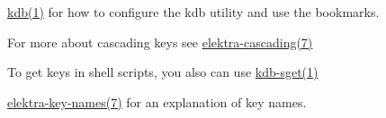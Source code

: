 \begin{DoxyItemize}
\item \hyperlink{doc_help_kdb_md}{kdb(1)} for how to configure the kdb utility and use the bookmarks.
\item For more about cascading keys see \hyperlink{doc_help_elektra-cascading_md}{elektra-\/cascading(7)}
\item To get keys in shell scripts, you also can use \hyperlink{doc_help_kdb-sget_md}{kdb-\/sget(1)}
\item \hyperlink{doc_help_elektra-key-names_md}{elektra-\/key-\/names(7)} for an explanation of key names. 
\end{DoxyItemize}